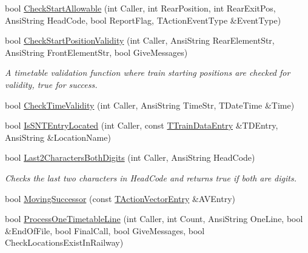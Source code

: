 \begin{DoxyCompactItemize}
\item 
bool \mbox{\hyperlink{class_t_train_controller_ab8d8cf015d4784f12585f0ead325e9bf}{Check\+Start\+Allowable}} (int Caller, int Rear\+Position, int Rear\+Exit\+Pos, Ansi\+String Head\+Code, bool Report\+Flag, T\+Action\+Event\+Type \&Event\+Type)
\item 
\mbox{\label{class_t_train_controller_a5c9711cc69c8332cf7db5e0b2696ca45}} 
bool \mbox{\hyperlink{class_t_train_controller_a5c9711cc69c8332cf7db5e0b2696ca45}{Check\+Start\+Position\+Validity}} (int Caller, Ansi\+String Rear\+Element\+Str, Ansi\+String Front\+Element\+Str, bool Give\+Messages)
\begin{DoxyCompactList}\small\item\em A timetable validation function where train starting positions are checked for validity, true for success. \end{DoxyCompactList}\item 
bool \mbox{\hyperlink{class_t_train_controller_a523077cf0c9c02c8cb56dab0af9b0e52}{Check\+Time\+Validity}} (int Caller, Ansi\+String Time\+Str, T\+Date\+Time \&Time)
\item 
bool \mbox{\hyperlink{class_t_train_controller_a61cdbf0085d24c76aa84e7d5e1d11ead}{Is\+S\+N\+T\+Entry\+Located}} (int Caller, const \mbox{\hyperlink{class_t_train_data_entry}{T\+Train\+Data\+Entry}} \&T\+D\+Entry, Ansi\+String \&Location\+Name)
\item 
\mbox{\label{class_t_train_controller_a6fc210d266e7672ccc648c0a9ab4e542}} 
bool \mbox{\hyperlink{class_t_train_controller_a6fc210d266e7672ccc648c0a9ab4e542}{Last2\+Characters\+Both\+Digits}} (int Caller, Ansi\+String Head\+Code)
\begin{DoxyCompactList}\small\item\em Checks the last two characters in Head\+Code and returns true if both are digits. \end{DoxyCompactList}\item 
bool \mbox{\hyperlink{class_t_train_controller_ae6c929171fa673b87e68694e6f48985d}{Moving\+Successor}} (const \mbox{\hyperlink{class_t_action_vector_entry}{T\+Action\+Vector\+Entry}} \&A\+V\+Entry)
\item 
bool \mbox{\hyperlink{class_t_train_controller_a5c51eb1e0018e189966ffdbc5d251990}{Process\+One\+Timetable\+Line}} (int Caller, int Count, Ansi\+String One\+Line, bool \&End\+Of\+File, bool Final\+Call, bool Give\+Messages, bool Check\+Locations\+Exist\+In\+Railway)

\end{DoxyCompactItemize}
